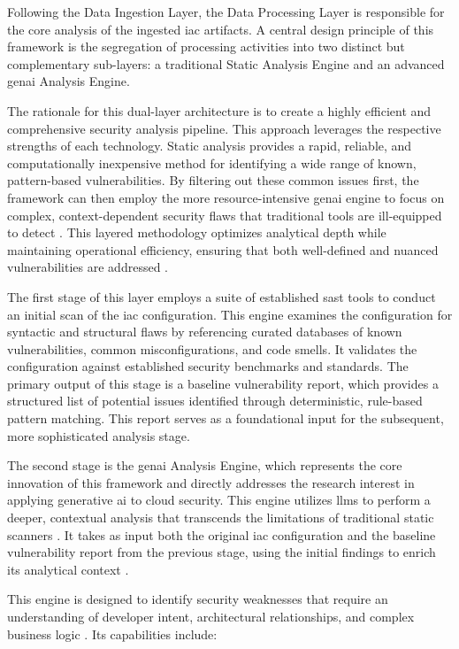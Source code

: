 Following the Data Ingestion Layer, the Data Processing Layer is responsible for the core analysis of the ingested \gls{iac} artifacts. A central design principle of this framework is the segregation of processing activities into two distinct but complementary sub-layers: a traditional Static Analysis Engine and an advanced \gls{genai} Analysis Engine.

The rationale for this dual-layer architecture is to create a highly efficient and comprehensive security analysis pipeline. This approach leverages the respective strengths of each technology. Static analysis provides a rapid, reliable, and computationally inexpensive method for identifying a wide range of known, pattern-based vulnerabilities. By filtering out these common issues first, the framework can then employ the more resource-intensive \gls{genai} engine to focus on complex, context-dependent security flaws that traditional tools are ill-equipped to detect \cite{zhang_empirical_2024}. This layered methodology optimizes analytical depth while maintaining operational efficiency, ensuring that both well-defined and nuanced vulnerabilities are addressed \cite{khanna_enhancing_2024}.

The first stage of this layer employs a suite of established \gls{sast} tools to conduct an initial scan of the \gls{iac} configuration. This engine examines the configuration for syntactic and structural flaws by referencing curated databases of known vulnerabilities, common misconfigurations, and code smells. It validates the configuration against established security benchmarks and standards. The primary output of this stage is a baseline vulnerability report, which provides a structured list of potential issues identified through deterministic, rule-based pattern matching. This report serves as a foundational input for the subsequent, more sophisticated analysis stage.

The second stage is the \gls{genai} Analysis Engine, which represents the core innovation of this framework and directly addresses the research interest in applying generative \gls{ai} to cloud security. This engine utilizes \glspl{llm} to perform a deeper, contextual analysis that transcends the limitations of traditional static scanners \cite{noauthor_artificial_2025}. It takes as input both the original \gls{iac} configuration and the baseline vulnerability report from the previous stage, using the initial findings to enrich its analytical context \cite{noauthor_towards_2025}.

This engine is designed to identify security weaknesses that require an understanding of developer intent, architectural relationships, and complex business logic \cite{noseevich_towards_2015}. Its capabilities include:


